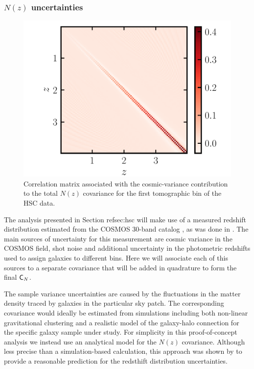 \documentclass[a4paper,11pt]{article}
\begin{document}
      \subsubsection{$N(z)$ uncertainties}\label{sssec:theory.prior.cv}
        \begin{figure}[ht]
          \centering  
          \includegraphics[width=1.\textwidth]{./corr_CV_0}
          \caption{Correlation matrix associated with the cosmic-variance contribution to the total $N(z)$ covariance for the first tomographic bin of the HSC data.}\label{fig:CV}
        \end{figure}
        The analysis presented in Section ref{sec:hsc} will make use of a measured redshift distribution estimated from the COSMOS 30-band catalog \cite{2016ApJS..224...24L}, as was done in \cite{1912.08209}. The main sources of uncertainty for this measurement are cosmic variance in the COSMOS field, shot noise and additional uncertainty in the photometric redshifts used to assign galaxies to different bins. Here we will associate each of this sources to a separate covariance that will be added in quadrature to form the final ${\sf C}_N$.
        
        The sample variance uncertainties are caused by the fluctuations in the matter density traced by galaxies in the particular sky patch. The corresponding covariance would ideally be estimated from simulations including both non-linear gravitational clustering and a realistic model of the galaxy-halo connection for the specific galaxy sample under study. For simplicity in this proof-of-concept analysis we instead use an analytical model for the $N(z)$ covariance. Although less precise than a simulation-based calculation, this approach was shown by \cite{2004.09542} to provide a reasonable prediction for the redsthift distribution uncertainties.
\end{document}
